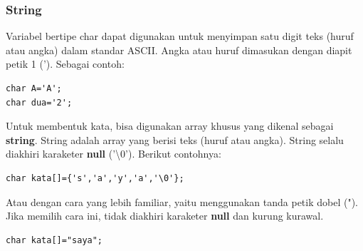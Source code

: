 \documentclass[12pt,]{article}
\begin{document}
	\subsubsection{String}

	Variabel bertipe char dapat digunakan untuk menyimpan satu digit teks (huruf atau angka) dalam standar ASCII.
	Angka atau huruf dimasukan dengan diapit petik 1 (').
	Sebagai contoh:
	\begin{verbatim}
char A='A';
char dua='2';
	\end{verbatim}

	Untuk membentuk kata, bisa digunakan array khusus yang dikenal sebagai \textbf{string}.
	String adalah array yang berisi teks (huruf atau angka).
	String selalu diakhiri karaketer \textbf{null} ('\textbackslash0').
	Berikut contohnya:
	\begin{verbatim}
char kata[]={'s','a','y','a','\0'};
	\end{verbatim}

	Atau dengan cara yang lebih familiar, yaitu menggunakan tanda petik dobel (").
	Jika memilih cara ini, tidak diakhiri karaketer \textbf{null} dan kurung kurawal.
	\begin{verbatim}
char kata[]="saya";
	\end{verbatim}
\end{document}
